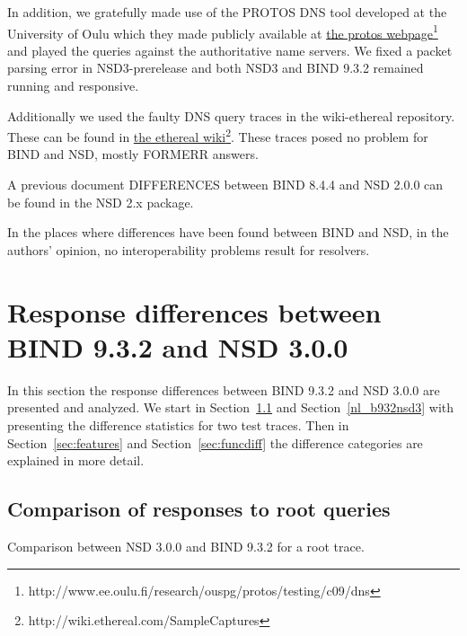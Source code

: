 \documentclass[twoside,titlepage,english]{nlnetlabs}
\begin{document}
In addition, we gratefully made use of the PROTOS DNS tool developed 
at the University of Oulu which they made publicly available at 
\href{http://www.ee.oulu.fi/research/ouspg/protos/testing/c09/dns}
{the protos webpage}\footnote{http://www.ee.oulu.fi/research/ouspg/protos/testing/c09/dns}
and played the queries against the authoritative name servers.
We fixed a packet parsing error in NSD3-prerelease and both NSD3 and
BIND 9.3.2 remained running and responsive.

Additionally we used the faulty DNS query traces in the wiki-ethereal
repository. These can be found in \href{http://wiki.ethereal.com/SampleCaptures}
{the ethereal wiki}\footnote{http://wiki.ethereal.com/SampleCaptures}.
These traces posed no problem for BIND and NSD, mostly FORMERR answers.

A previous document DIFFERENCES between BIND 8.4.4 and NSD 2.0.0 can be found
in the NSD 2.x package.

In the places where differences have been found between BIND and NSD,
in the authors' opinion, no interoperability problems result for resolvers.


\section{Response differences between BIND 9.3.2 and NSD 3.0.0}

In this section the response differences between BIND 9.3.2 and NSD 3.0.0
are presented and analyzed. We start in Section~\ref{root_b932nsd3} and 
Section~\ref{nl_b932nsd3} with presenting
the difference statistics for two test traces. Then in 
Section~\ref{sec:features} and Section~\ref{sec:funcdiff}
the difference categories are explained in more detail.


\subsection{Comparison of responses to root queries}
\label{root_b932nsd3}

Comparison between NSD 3.0.0 and BIND 9.3.2 for a root trace.
\end{document}
